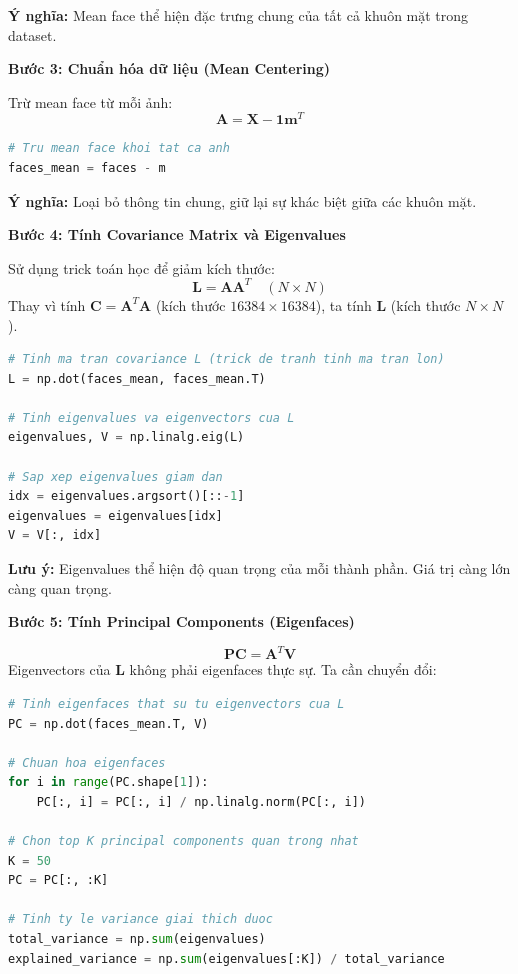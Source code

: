 \textbf{Ý nghĩa:} Mean face thể hiện đặc trưng chung của tất cả khuôn mặt trong dataset.

\textbf{Bước 3: Chuẩn hóa dữ liệu (Mean Centering)}

Trừ mean face từ mỗi ảnh:
\begin{equation}
    \mathbf{A} = \mathbf{X} - \mathbf{1}\mathbf{m}^T
\end{equation}
\begin{lstlisting}[language=Python]
# Tru mean face khoi tat ca anh
faces_mean = faces - m
\end{lstlisting}

\textbf{Ý nghĩa:} Loại bỏ thông tin chung, giữ lại sự khác biệt giữa các khuôn mặt.

\textbf{Bước 4: Tính Covariance Matrix và Eigenvalues}

Sử dụng trick toán học để giảm kích thước:
\begin{equation}
    \mathbf{L} = \mathbf{A}\mathbf{A}^T \quad (N \times N)
\end{equation}
Thay vì tính $\mathbf{C} = \mathbf{A}^T\mathbf{A}$ (kích thước $16384 \times 16384$), ta tính $\mathbf{L}$ (kích thước $N \times N$).

\begin{lstlisting}[language=Python]
# Tinh ma tran covariance L (trick de tranh tinh ma tran lon)
L = np.dot(faces_mean, faces_mean.T)

# Tinh eigenvalues va eigenvectors cua L
eigenvalues, V = np.linalg.eig(L)

# Sap xep eigenvalues giam dan
idx = eigenvalues.argsort()[::-1]
eigenvalues = eigenvalues[idx]
V = V[:, idx]
\end{lstlisting}

\textbf{Lưu ý:} Eigenvalues thể hiện độ quan trọng của mỗi thành phần. Giá trị càng lớn càng quan trọng.

\textbf{Bước 5: Tính Principal Components (Eigenfaces)}

\begin{equation}
    \mathbf{PC} = \mathbf{A}^T\mathbf{V}
\end{equation}
Eigenvectors của $\mathbf{L}$ không phải eigenfaces thực sự. Ta cần chuyển đổi:

\begin{lstlisting}[language=Python]
# Tinh eigenfaces that su tu eigenvectors cua L
PC = np.dot(faces_mean.T, V)

# Chuan hoa eigenfaces
for i in range(PC.shape[1]):
    PC[:, i] = PC[:, i] / np.linalg.norm(PC[:, i])

# Chon top K principal components quan trong nhat
K = 50
PC = PC[:, :K]

# Tinh ty le variance giai thich duoc
total_variance = np.sum(eigenvalues)
explained_variance = np.sum(eigenvalues[:K]) / total_variance
\end{lstlisting}

